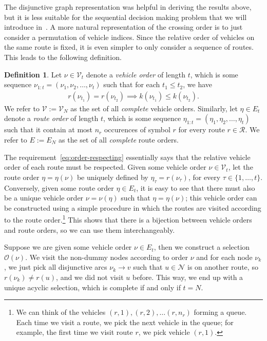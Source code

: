 \documentclass[a4paper]{report}
\theoremstyle{definition}
\newtheorem{define}{Definition}[chapter]
\theoremstyle{plain}
\begin{document}
The disjunctive graph representation was helpful in deriving the results above,
but it is less suitable for the sequential decision making problem that we will
introduce in~.
%
A more natural representation of the crossing order is to just consider a
permutation of vehicle indices.
%
Since the relative order of vehicles on the same route is fixed, it is even
simpler to only consider a sequence of routes.
%
This leads to the following definition.

\begin{define}
  Let $\nu \in \mathcal{V}_t$ denote a \emph{vehicle order} of length $t$,
  which is some sequence $\nu_{1:t} = (\nu_1, \nu_2, \dots, \nu_t)$ such that for each
  $t_1 \leq t_2$, we have
  \begin{align}\label{eq:order-respecting}
    r(\nu_{t_1}) = r(\nu_{t_2}) \implies k(\nu_{t_1}) \leq k(\nu_{t_2}) .
  \end{align}
  We refer to $\mathcal{V} := \mathcal{V}_N$ as the set of all \emph{complete}
  vehicle orders.
  Similarly, let $\eta \in E_t$ denote a \emph{route order} of length $t$, which is some
  sequence $\eta_{1:t} = (\eta_1, \eta_2, \dots, \eta_t)$ such that it contain at most
  $n_r$ occurences of symbol $r$ for every route $r \in \mathcal{R}$. We refer to
  $E := E_N$ as the set of all \emph{complete} route orders.
\end{define}

The requirement~\eqref{eq:order-respecting} essentially says that the relative
vehicle order of each route must be respected.
%
Given some vehicle order $\nu \in \mathcal{V}_t$, let the route order
$\eta = \eta(\nu)$ be uniquely defined by $\eta_\tau = r(\nu_\tau)$, for every
$\tau \in \{ 1, \dots, t \}$.
%
Conversely, given some route order $\eta \in E_t$, it is easy to see that there must
also be a unique vehicle order $\nu = \nu(\eta)$ such that $\eta = \eta(\nu)$; this
vehicle order can be constructed using a simple procedure in which the routes
are visited according to the route order.\footnote{We can think of the vehicles
  $(r,1), (r,2), \dots (r,n_r)$ forming a queue. Each time we visit a route, we
  pick the next vehicle in the queue; for example, the first time we visit route
  $r$, we pick vehicle $(r, 1)$.}
%
This shows that there is a bijection between vehicle orders and route orders, so
we can use them interchangeably.

Suppose we are given some vehicle order $\nu \in E_t$, then we construct a
selection $\mathcal{O}(\nu)$.
%
We visit the non-dummy nodes according to order $\nu$ and for each node $\nu_k$,
we just pick all disjunctive arcs $\nu_k \rightarrow v$ such that
$u \in \mathcal{N}$ is on another route, so $r(\nu_k) \neq r(u)$, and we did not
visit $u$ before.
%
This way, we end up with a unique acyclic selection, which is complete if and
only if $t = N$.
\end{document}
